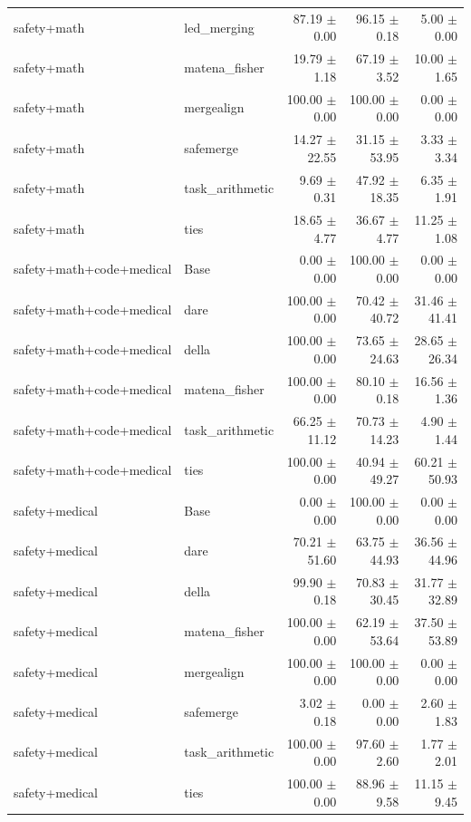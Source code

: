 \documentclass{article}
\begin{document}
\begin{table}[H]
{\begin{tabular}{llrrr}
safety+math & led\_merging & 87.19 $\pm$ 0.00 & 96.15 $\pm$ 0.18 & 5.00 $\pm$ 0.00 \\
safety+math & matena\_fisher & 19.79 $\pm$ 1.18 & 67.19 $\pm$ 3.52 & 10.00 $\pm$ 1.65 \\
safety+math & mergealign & 100.00 $\pm$ 0.00 & 100.00 $\pm$ 0.00 & 0.00 $\pm$ 0.00 \\
safety+math & safemerge & 14.27 $\pm$ 22.55 & 31.15 $\pm$ 53.95 & 3.33 $\pm$ 3.34 \\
safety+math & task\_arithmetic & 9.69 $\pm$ 0.31 & 47.92 $\pm$ 18.35 & 6.35 $\pm$ 1.91 \\
safety+math & ties & 18.65 $\pm$ 4.77 & 36.67 $\pm$ 4.77 & 11.25 $\pm$ 1.08 \\
safety+math+code+medical & Base & 0.00 $\pm$ 0.00 & 100.00 $\pm$ 0.00 & 0.00 $\pm$ 0.00 \\
safety+math+code+medical & dare & 100.00 $\pm$ 0.00 & 70.42 $\pm$ 40.72 & 31.46 $\pm$ 41.41 \\
safety+math+code+medical & della & 100.00 $\pm$ 0.00 & 73.65 $\pm$ 24.63 & 28.65 $\pm$ 26.34 \\
safety+math+code+medical & matena\_fisher & 100.00 $\pm$ 0.00 & 80.10 $\pm$ 0.18 & 16.56 $\pm$ 1.36 \\
safety+math+code+medical & task\_arithmetic & 66.25 $\pm$ 11.12 & 70.73 $\pm$ 14.23 & 4.90 $\pm$ 1.44 \\
safety+math+code+medical & ties & 100.00 $\pm$ 0.00 & 40.94 $\pm$ 49.27 & 60.21 $\pm$ 50.93 \\
safety+medical & Base & 0.00 $\pm$ 0.00 & 100.00 $\pm$ 0.00 & 0.00 $\pm$ 0.00 \\
safety+medical & dare & 70.21 $\pm$ 51.60 & 63.75 $\pm$ 44.93 & 36.56 $\pm$ 44.96 \\
safety+medical & della & 99.90 $\pm$ 0.18 & 70.83 $\pm$ 30.45 & 31.77 $\pm$ 32.89 \\
safety+medical & matena\_fisher & 100.00 $\pm$ 0.00 & 62.19 $\pm$ 53.64 & 37.50 $\pm$ 53.89 \\
safety+medical & mergealign & 100.00 $\pm$ 0.00 & 100.00 $\pm$ 0.00 & 0.00 $\pm$ 0.00 \\
safety+medical & safemerge & 3.02 $\pm$ 0.18 & 0.00 $\pm$ 0.00 & 2.60 $\pm$ 1.83 \\
safety+medical & task\_arithmetic & 100.00 $\pm$ 0.00 & 97.60 $\pm$ 2.60 & 1.77 $\pm$ 2.01 \\
safety+medical & ties & 100.00 $\pm$ 0.00 & 88.96 $\pm$ 9.58 & 11.15 $\pm$ 9.45 \\
\bottomrule
\end{tabular}
}
\end{table}
\end{document}
